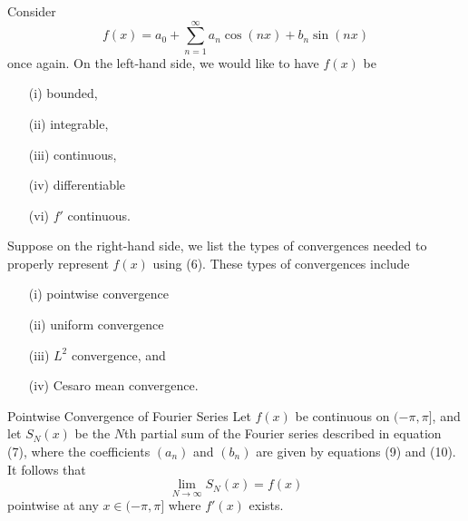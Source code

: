 Consider 
\[  f(x) = a_{0} + \sum_{ n=1 }^{ \infty  } a_{n} \cos(nx) + b_{n} \sin(nx) \] once again.
On the left-hand side, we would like to have \( f(x)  \) be 
\begin{enumerate}
    \item[(i)] bounded,
    \item[(ii)] integrable,
    \item[(iii)] continuous,
    \item[(iv)] differentiable 
    \item[(vi)] \( f'  \) continuous.
\end{enumerate}
Suppose on the right-hand side, we list the types of convergences needed to properly represent \( f(x)  \) using (6). These types of convergences include 
\begin{enumerate}
    \item[(i)] pointwise convergence
    \item[(ii)] uniform convergence
    \item[(iii)] \( L^{2}  \) convergence, and
    \item[(iv)] Cesaro mean convergence.
\end{enumerate}

\begin{theorem}{Pointwise Convergence of Fourier Series}{}
    Let \( f(x)  \) be continuous on \( (- \pi , \pi]  \), and let \( S_{N}(x)  \) be the \( N \)th partial sum of the Fourier series described in equation (7), where the coefficients \( (a_{n}) \) and \( (b_{n}) \) are given by equations (9) and (10). It follows that 
    \[  \lim_{ N \to \infty  }  S_{N}(x) = f(x)  \] 
    pointwise at any \( x \in (-\pi, \pi]   \) where \( f'(x)  \) exists.
\end{theorem}

